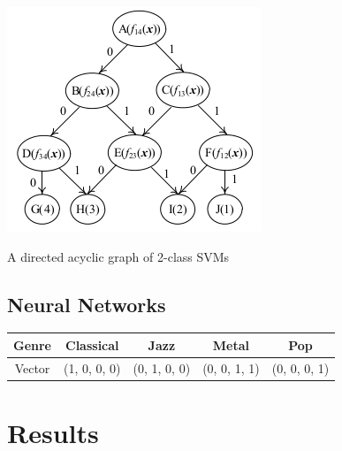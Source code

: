 \documentclass{article} %
\begin{document}
\begin{minipage}{.5\textwidth}\centering
  \includegraphics[width=.58\textwidth]{images/techniques-dag-example.png}

  A directed acyclic graph of 2-class SVMs
\end{minipage}
\begin{minipage}{.5\textwidth}%

\end{minipage}


\subsection{Neural Networks}



\begin{center}
\begin{tabular}{| c | c | c | c | c |}
\hline
Genre & Classical & Jazz & Metal & Pop \\
\hline
Vector & (1, 0, 0, 0) & (0, 1, 0, 0) & (0, 0, 1, 1) & (0, 0, 0, 1) \\
\hline
\end{tabular}
\end{center}




\section{Results}
\end{document}
